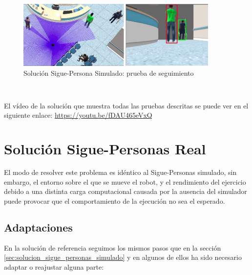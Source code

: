 \begin{itemize}
	\begin{figure} [H]
		\begin{center}
		\includegraphics[width=10cm]{imagenes/cap6/sim-solution-tracking-test.png}
		\end{center}
		\caption[Solución Sigue-Persona Simulado: prueba de seguimiento]{Solución Sigue-Persona Simulado: prueba de seguimiento}
		\label{fig:sim_solucion_tracking_test}
	\end{figure}
\end{itemize}\

El vídeo de la solución que muestra todas las pruebas descritas se puede ver en el siguiente enlace: \url{https://youtu.be/fDAU465eVxQ}\\




\section{Solución Sigue-Personas Real}
\label{sec:solucion_sigue_personas_real}

El modo de resolver este problema es idéntico al Sigue-Personas simulado, sin embargo, el entorno sobre el que se mueve el robot, y el rendimiento del ejercicio debido a una distinta carga computacional causada por la ausencia del simulador puede provocar que el comportamiento de la ejecución no sea el esperado.\\

\subsection{Adaptaciones}
\label{subsec:adaptaciones}

En la solución de referencia seguimos los mismos pasos que en la sección \ref{sec:solucion_sigue_personas_simulado} y en algunos de ellos ha sido necesario adaptar o reajustar alguna parte:\\

